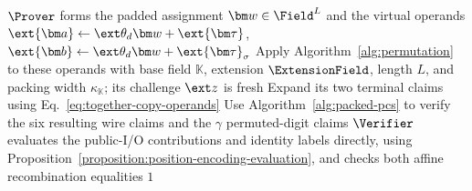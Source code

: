 \begin{algorithm}[!t]
\(\Prover\) forms the padded assignment \(\bm w\in\Field^L\)
and the virtual operands
\(\ext{\bm a}\leftarrow\ext\theta_d\bm w+\ext{\bm\tau}\),
\(\ext{\bm b}\leftarrow\ext\theta_d\bm w+\ext{\bm\tau}_\sigma\)\;
Apply Algorithm~\ref{alg:permutation} to these operands with
base field \(\mathbb K\), extension \(\ExtensionField\),
length \(L\), and packing width \(\kappa_{\mathbb K}\);
its challenge \(\ext z\) is fresh\;
Expand its two terminal claims using
Eq.~\eqref{eq:together-copy-operands}\;
Use Algorithm~\ref{alg:packed-pcs} to verify the six resulting
wire claims and the \(\gamma\) permuted-digit claims\;
\(\Verifier\) evaluates the public-I/O contributions and
identity labels directly, using
Proposition~\ref{proposition:position-encoding-evaluation},
and checks both affine recombination equalities\;
\Return \(1\)\;
\end{algorithm}
